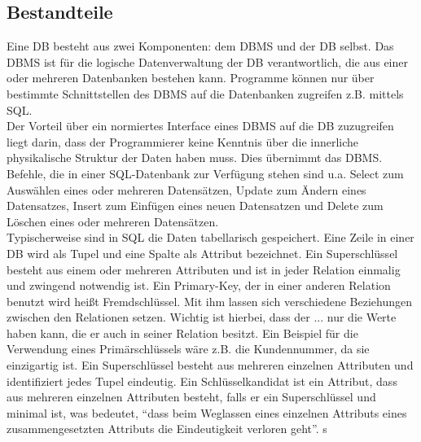 \subsection*{Bestandteile}
\label{ssec:Datenbanken_Bestandteile}
Eine \acf{DB} besteht aus zwei Komponenten: dem \acf{DBMS} und der \acs{DB} selbst. 
Das \ac{DBMS} ist für die logische Datenverwaltung der \acs{DB} verantwortlich, die aus einer oder mehreren Datenbanken bestehen kann. 
Programme können nur über bestimmte Schnittstellen des \acs{DBMS} auf die Datenbanken zugreifen z.B. mittels \acs{SQL}.\autocite{Book_DB_1}\autocite{Book_DB_2}\\
Der Vorteil über ein normiertes Interface eines \acs{DBMS} auf die \acs{DB} zuzugreifen liegt darin, dass der Programmierer keine Kenntnis über die innerliche physikalische Struktur der Daten haben muss. 
Dies übernimmt das \acs{DBMS}.\autocite[vgl. S.4][]{Schicker2017DatenbankenSQL} \\
Befehle, die in einer \acs{SQL}-Datenbank zur Verfügung stehen sind u.a. Select zum Auswählen eines oder mehreren Datensätzen, Update zum Ändern eines Datensatzes, Insert zum Einfügen eines neuen Datensatzen und Delete zum Löschen eines oder mehreren Datensätzen. \\
Typischerweise sind in \acs{SQL} die Daten tabellarisch gespeichert. 
Eine Zeile in einer \acs{DB} wird als Tupel und eine Spalte als Attribut bezeichnet.\autocite[vgl. S.4][]{Schicker2017DatenbankenSQL}
Ein Superschlüssel besteht aus einem oder mehreren Attributen und ist in jeder Relation einmalig und zwingend notwendig ist. Ein Primary-Key, der in einer anderen Relation benutzt wird heißt Fremdschlüssel. Mit ihm lassen sich verschiedene Beziehungen zwischen den Relationen setzen. Wichtig ist hierbei, dass der ... nur die Werte haben kann, die er auch in seiner Relation besitzt. Ein Beispiel für die Verwendung eines Primärschlüssels wäre z.B. die Kundennummer, da sie einzigartig ist. Ein Superschlüssel besteht aus mehreren einzelnen Attributen und identifiziert jedes Tupel eindeutig. Ein Schlüsselkandidat ist ein Attribut, dass aus mehreren einzelnen Attributen besteht, falls er ein Superschlüssel und minimal ist, was bedeutet, \enquote{dass beim Weglassen eines einzelnen Attributs eines zusammengesetzten
Attributs die Eindeutigkeit verloren geht}.\autocite[vgl. S.31 f.][]{Schicker2017DatenbankenSQL} s